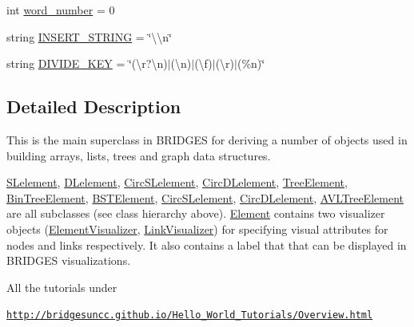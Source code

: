 \begin{DoxyCompactItemize}
\item 
int \hyperlink{class_bridges_1_1_element_1_1_element_a857960f476b18de30baa18ae54877672}{word\+\_\+number} = 0
\item 
string \hyperlink{class_bridges_1_1_element_1_1_element_ab39bc7d8e0dc982c771602c6488f691e}{I\+N\+S\+E\+R\+T\+\_\+\+S\+T\+R\+I\+N\+G} = \char`\"{}\textbackslash{}\textbackslash{}n\char`\"{}
\item 
string \hyperlink{class_bridges_1_1_element_1_1_element_a73062c7f01d5cbac8f1ea19095904cda}{D\+I\+V\+I\+D\+E\+\_\+\+K\+E\+Y} = \char`\"{}(\textbackslash{}r?\textbackslash{}n)$\vert$(\textbackslash{}n)$\vert$(\textbackslash{}f)$\vert$(\textbackslash{}r)$\vert$(\%n)\char`\"{}
\end{DoxyCompactItemize}


\subsection{Detailed Description}
This is the main superclass in B\+R\+I\+D\+G\+E\+S for deriving a number of objects used in building arrays, lists, trees and graph data structures. 

\hyperlink{namespace_bridges_1_1_s_lelement}{S\+Lelement}, \hyperlink{namespace_bridges_1_1_d_lelement}{D\+Lelement}, \hyperlink{namespace_bridges_1_1_circ_s_lelement}{Circ\+S\+Lelement}, \hyperlink{namespace_bridges_1_1_circ_d_lelement}{Circ\+D\+Lelement}, \hyperlink{namespace_bridges_1_1_tree_element}{Tree\+Element}, \hyperlink{namespace_bridges_1_1_bin_tree_element}{Bin\+Tree\+Element}, \hyperlink{namespace_bridges_1_1_b_s_t_element}{B\+S\+T\+Element}, \hyperlink{namespace_bridges_1_1_circ_s_lelement}{Circ\+S\+Lelement}, \hyperlink{namespace_bridges_1_1_circ_d_lelement}{Circ\+D\+Lelement}, \hyperlink{namespace_bridges_1_1_a_v_l_tree_element}{A\+V\+L\+Tree\+Element} are all subclasses (see class hierarchy above). \hyperlink{class_bridges_1_1_element_1_1_element}{Element} contains two visualizer objects (\hyperlink{namespace_bridges_1_1_element_visualizer}{Element\+Visualizer}, \hyperlink{namespace_bridges_1_1_link_visualizer}{Link\+Visualizer}) for specifying visual attributes for nodes and links respectively. It also contains a label that that can be displayed in B\+R\+I\+D\+G\+E\+S visualizations.

All the tutorials under

\href{http://bridgesuncc.github.io/Hello_World_Tutorials/Overview.html}{\tt http\+://bridgesuncc.\+github.\+io/\+Hello\+\_\+\+World\+\_\+\+Tutorials/\+Overview.\+html}

